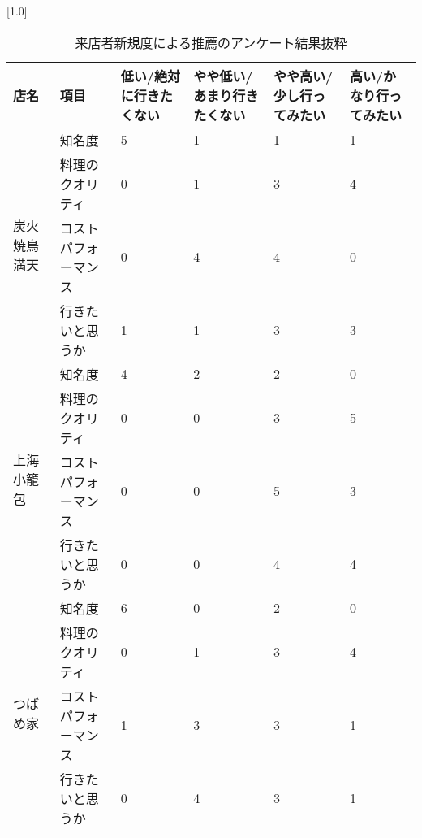 \begin{table}[H]
\centering
\caption{来店者新規度による推薦のアンケート結果抜粋}
\label{table:questionnaire:VN}
\small
\scalebox{0.7}[1.0]{
\begin{tabular}{|l|l|l|l|l|l|}
\hline
店名 & 項目 & 低い/絶対に行きたくない & やや低い/あまり行きたくない & やや高い/少し行ってみたい & 高い/かなり行ってみたい \\ \hline
\multirow{4}{*}{炭火焼鳥 満天} & 知名度 & 5 & 1 & 1 & 1 \\ \cline{2-6}
 & 料理のクオリティ & 0 & 1 & 3 & 4 \\ \cline{2-6}
 & コストパフォーマンス & 0 & 4 & 4 & 0 \\ \cline{2-6}
 & 行きたいと思うか & 1 & 1 & 3 & 3 \\ \hline
\multirow{4}{*}{上海小籠包} & 知名度 & 4 & 2 & 2 & 0 \\ \cline{2-6}
 & 料理のクオリティ & 0 & 0 & 3 & 5 \\ \cline{2-6}
 & コストパフォーマンス & 0 & 0 & 5 & 3 \\ \cline{2-6}
 & 行きたいと思うか & 0 & 0 & 4 & 4 \\ \hline
\multirow{4}{*}{つばめ家} & 知名度 & 6 & 0 & 2 & 0 \\ \cline{2-6}
 & 料理のクオリティ & 0 & 1 & 3 & 4 \\ \cline{2-6}
 & コストパフォーマンス & 1 & 3 & 3 & 1 \\ \cline{2-6}
 & 行きたいと思うか & 0 & 4 & 3 & 1 \\ \hline
\end{tabular}
}
\end{table}
